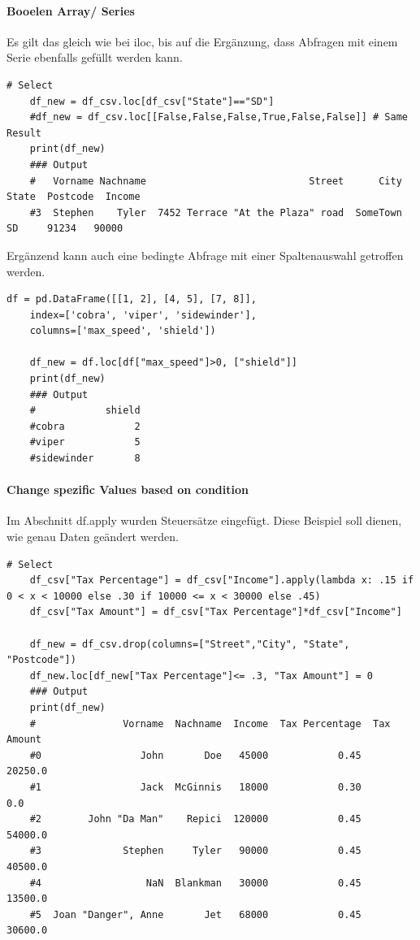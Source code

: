 \paragraph*{Booelen Array/ Series}
Es gilt das gleich wie bei iloc, bis auf die Ergänzung, dass Abfragen mit einem Serie ebenfalls gefüllt werden kann.

\begin{lstlisting}[style=python]
	# Select 
	df_new = df_csv.loc[df_csv["State"]=="SD"]
	#df_new = df_csv.loc[[False,False,False,True,False,False]] # Same Result
	print(df_new)
	### Output
	#   Vorname Nachname                            Street      City State  Postcode  Income
	#3  Stephen    Tyler  7452 Terrace "At the Plaza" road  SomeTown    SD     91234   90000
\end{lstlisting}
Ergänzend kann auch eine bedingte Abfrage mit einer Spaltenauswahl getroffen werden.
\begin{lstlisting}[style=python]
	df = pd.DataFrame([[1, 2], [4, 5], [7, 8]],
	index=['cobra', 'viper', 'sidewinder'],
	columns=['max_speed', 'shield'])
	
	df_new = df.loc[df["max_speed"]>0, ["shield"]]
	print(df_new)
	### Output
	#            shield
	#cobra            2
	#viper            5
	#sidewinder       8
\end{lstlisting}

\paragraph*{Change spezific Values based on condition}
Im Abschnitt df.apply wurden Steuersätze eingefügt. Diese Beispiel soll dienen, wie genau Daten geändert werden.
\begin{lstlisting}[style=python]
	# Select
	df_csv["Tax Percentage"] = df_csv["Income"].apply(lambda x: .15 if 0 < x < 10000 else .30 if 10000 <= x < 30000 else .45)
	df_csv["Tax Amount"] = df_csv["Tax Percentage"]*df_csv["Income"]
	
	df_new = df_csv.drop(columns=["Street","City", "State", "Postcode"])
	df_new.loc[df_new["Tax Percentage"]<= .3, "Tax Amount"] = 0
	### Output
	print(df_new)
	#               Vorname  Nachname  Income  Tax Percentage  Tax Amount
	#0                 John       Doe   45000            0.45     20250.0
	#1                 Jack  McGinnis   18000            0.30         0.0
	#2        John "Da Man"    Repici  120000            0.45     54000.0
	#3              Stephen     Tyler   90000            0.45     40500.0
	#4                  NaN  Blankman   30000            0.45     13500.0
	#5  Joan "Danger", Anne       Jet   68000            0.45     30600.0
\end{lstlisting}



